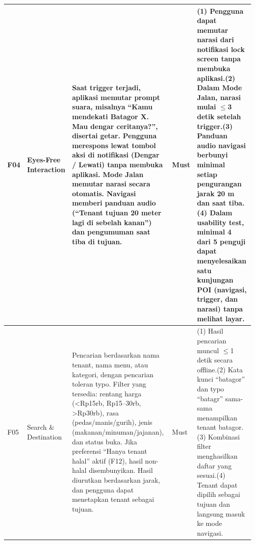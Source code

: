 \begin{longtable}{|L{0.075}|L{0.226}|L{0.299}|L{0.093}|L{0.307}|}
F04 & Eyes-Free Interaction & Saat trigger terjadi, aplikasi memutar prompt suara, misalnya ``Kamu mendekati Batagor X. Mau dengar ceritanya?'', disertai getar. Pengguna merespons lewat tombol aksi di notifikasi (Dengar / Lewati) tanpa membuka aplikasi. Mode Jalan memutar narasi secara otomatis. Navigasi memberi panduan audio (``Tenant tujuan 20 meter lagi di sebelah kanan'') dan pengumuman saat tiba di tujuan. & Must & (1) Pengguna dapat memutar narasi dari notifikasi lock screen tanpa membuka aplikasi.\newline (2) Dalam Mode Jalan, narasi mulai \(\le\)3 detik setelah trigger.\newline (3) Panduan audio navigasi berbunyi minimal setiap pengurangan jarak 20 m dan saat tiba.\newline (4) Dalam usability test, minimal 4 dari 5 penguji dapat menyelesaikan satu kunjungan POI (navigasi, trigger, dan narasi) tanpa melihat layar. \\ \hline
F05 & Search \& Destination & Pencarian berdasarkan nama tenant, nama menu, atau kategori, dengan pencarian toleran typo. Filter yang tersedia: rentang harga (\textless{}Rp15rb, Rp15--30rb, \textgreater{}Rp30rb), rasa (pedas/manis/gurih), jenis (makanan/minuman/jajanan), dan status buka. Jika preferensi ``Hanya tenant halal'' aktif (F12), hasil non-halal disembunyikan. Hasil diurutkan berdasarkan jarak, dan pengguna dapat menetapkan tenant sebagai tujuan. & Must & (1) Hasil pencarian muncul \(\le\)1 detik secara offline.\newline (2) Kata kunci ``batagor'' dan typo ``batagr'' sama-sama menampilkan tenant batagor.\newline (3) Kombinasi filter menghasilkan daftar yang sesuai.\newline (4) Tenant dapat dipilih sebagai tujuan dan langsung masuk ke mode navigasi. \\ \hline

\end{longtable}
